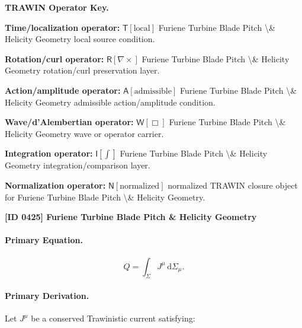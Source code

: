 \par\vspace{0.45\baselineskip}
\noindent\begin{minipage}[t]{\linewidth}
\begingroup
\small
\raggedright
\textbf{TRAWIN Operator Key.}\par
\noindent\textbf{Time/localization operator:} $\mathsf{T}\!\left[\mathrm{local}\right]$ Furiene Turbine Blade Pitch \textbackslash{}\& Helicity Geometry local source condition.\par
\noindent\textbf{Rotation/curl operator:} $\mathsf{R}\!\left[\nabla\times\right]$ Furiene Turbine Blade Pitch \textbackslash{}\& Helicity Geometry rotation/curl preservation layer.\par
\noindent\textbf{Action/amplitude operator:} $\mathsf{A}\!\left[\mathrm{admissible}\right]$ Furiene Turbine Blade Pitch \textbackslash{}\& Helicity Geometry admissible action/amplitude condition.\par
\noindent\textbf{Wave/d'Alembertian operator:} $\mathsf{W}\!\left[\Box\right]$ Furiene Turbine Blade Pitch \textbackslash{}\& Helicity Geometry wave or operator carrier.\par
\noindent\textbf{Integration operator:} $\mathsf{I}\!\left[\int\right]$ Furiene Turbine Blade Pitch \textbackslash{}\& Helicity Geometry integration/comparison layer.\par
\noindent\textbf{Normalization operator:} $\mathsf{N}\!\left[\mathrm{normalized}\right]$ normalized TRAWIN closure object for Furiene Turbine Blade Pitch \textbackslash{}\& Helicity Geometry.\par
\endgroup
\end{minipage}

\clearpage
\noindent\textbf{[ID 0425] Furiene Turbine Blade Pitch \& Helicity Geometry}\par
\vspace{0.35em}
\paragraph{Primary Equation.}
\begin{equation}
Q
=
\int_{\Sigma}
J^\mu
\,\mathrm{d}\Sigma_\mu .
\end{equation}

\paragraph{Primary Derivation.}
Let $J^\mu$ be a conserved Trawinistic current satisfying:


